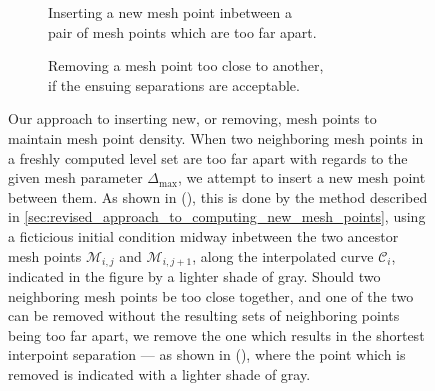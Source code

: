 \begin{figure}[htpb]
    \centering
    \begin{subfigure}[b]{0.475\textwidth}
        \centering
        \resizebox{0.9\linewidth}{!}%
        {}
        \caption[]{{\small Inserting a new mesh point inbetween a
        \\\phantom{(a)} pair of mesh points which are too far apart.}}
        \label{fig:mesh_management_pure_insertion}
    \end{subfigure}
    \begin{subfigure}[b]{0.475\textwidth}
        \centering
        \resizebox{0.9\linewidth}{!}%
        {}
        \caption[]{{\small Removing a mesh point too close to another,
        \\\phantom{(b)} if the ensuing separations are acceptable.}}
        \label{fig:mesh_management_pure_deletion}
    \end{subfigure}
    \caption[Our approach to inserting new, or removing, mesh points to
    maintain mesh point density]
    {Our approach to inserting new, or removing, mesh points to maintain
        mesh point density. When two neighboring mesh points in a freshly
        computed level set are too far apart with regards to the given mesh
        parameter $\Delta_{\max}$, we attempt to insert a new mesh point
        between them. As shown in
        (), this is done by
        the method described in
        \cref{sec:revised_approach_to_computing_new_mesh_points}, using a
        ficticious initial condition midway inbetween the two ancestor mesh
        points $\mathcal{M}_{i,j}$ and $\mathcal{M}_{i,j+1}$, along the
        interpolated curve $\mathcal{C}_{i}$, indicated in the figure by
        a lighter shade of gray. Should two neighboring mesh points
        be too close together, and one of the two can be removed without the
        resulting sets of neighboring points being too far apart, we remove
        the one which results in the shortest interpoint separation --- as
        shown in (), where the point
        which is removed is indicated with a lighter shade of gray.
    }
    \label{fig:mesh_management_insertion_and_deletion}
\end{figure}
